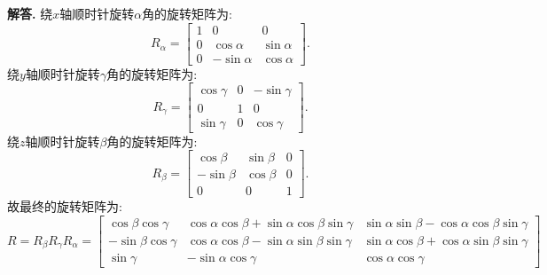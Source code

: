 \documentclass[11pt]{article}
\newenvironment{solution}{\par\noindent\textbf{解答. }}{\par}
\begin{document}
	\section{}
	\begin{solution}
		绕$x$轴顺时针旋转$\alpha$角的旋转矩阵为: $$R_\alpha=\begin{bmatrix}
			1 & 0 & 0 \\ 0 & \cos\alpha & \sin\alpha \\ 0 & -\sin\alpha & \cos\alpha
		\end{bmatrix}.$$
		绕$y$轴顺时针旋转$\gamma$角的旋转矩阵为: $$R_\gamma=\begin{bmatrix}
			\cos\gamma & 0 & -\sin\gamma \\ 0 & 1 & 0 \\ \sin\gamma & 0 & \cos\gamma \end{bmatrix}.$$
		绕$z$轴顺时针旋转$\beta$角的旋转矩阵为: $$R_\beta=\begin{bmatrix}
			\cos\beta & \sin\beta & 0 \\ -\sin\beta & \cos\beta & 0 \\ 0 & 0 & 1 \end{bmatrix}.$$
		故最终的旋转矩阵为: $$R=R_\beta R_\gamma R_\alpha=\begin{bmatrix}
			\cos\beta\cos\gamma & \cos\alpha\cos\beta+\sin\alpha\cos\beta\sin\gamma & \sin\alpha\sin\beta-\cos\alpha\cos\beta\sin\gamma \\
			-\sin\beta\cos\gamma & \cos\alpha\cos\beta-\sin\alpha\sin\beta\sin\gamma & \sin\alpha\cos\beta+\cos\alpha\sin\beta\sin\gamma \\
			\sin\gamma & -\sin\alpha\cos\gamma & \cos\alpha\cos\gamma
		\end{bmatrix}$$
	\end{solution}
	
\end{document}
